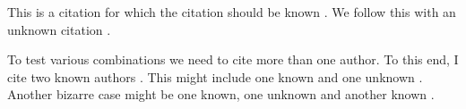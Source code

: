 \documentclass{article}
\begin{document}
This is a citation for which the citation should be known \cite{known}.
We follow this with an unknown citation \cite{unknown}.

To test various combinations we need to cite more than one author.  To this
end, I cite two known authors \cite{known,known2}.  This might include one
known and one unknown \cite{unknown ,known }.  Another bizarre case might be
one known, one unknown and another known \cite{known,unknown,  
known2  }.



\end{document}

